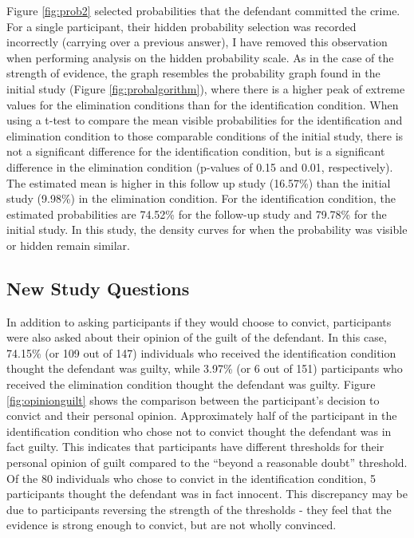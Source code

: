 \documentclass[print]{nuthesis}
\begin{document}
Figure \ref{fig:prob2} selected probabilities that the defendant committed the crime.
For a single participant, their hidden probability selection was recorded incorrectly (carrying over a previous answer), I have removed this observation when performing analysis on the hidden probability scale.
As in the case of the strength of evidence, the graph resembles the probability graph found in the initial study (Figure \ref{fig:probalgorithm}), where there is a higher peak of extreme values for the elimination conditions than for the identification condition.
When using a t-test to compare the mean visible probabilities for the identification and elimination condition to those comparable conditions of the initial study, there is not a significant difference for the identification condition, but is a significant difference in the elimination condition (p-values of 0.15 and 0.01, respectively).
The estimated mean is higher in this follow up study (16.57\%) than the initial study (9.98\%) in the elimination condition.
For the identification condition, the estimated probabilities are 74.52\% for the follow-up study and 79.78\% for the initial study.
In this study, the density curves for when the probability was visible or hidden remain similar.

\hypertarget{new-study-questions}{%
\subsection{New Study Questions}\label{new-study-questions}}

In addition to asking participants if they would choose to convict, participants were also asked about their opinion of the guilt of the defendant.
In this case, 74.15\% (or 109 out of 147) individuals who received the identification condition thought the defendant was guilty, while 3.97\% (or 6 out of 151) participants who received the elimination condition thought the defendant was guilty.
Figure \ref{fig:opinionguilt} shows the comparison between the participant's decision to convict and their personal opinion.
Approximately half of the participant in the identification condition who chose not to convict thought the defendant was in fact guilty.
This indicates that participants have different thresholds for their personal opinion of guilt compared to the ``beyond a reasonable doubt'' threshold.
Of the 80 individuals who chose to convict in the identification condition, 5 participants thought the defendant was in fact innocent.
This discrepancy may be due to participants reversing the strength of the thresholds - they feel that the evidence is strong enough to convict, but are not wholly convinced.
\end{document}
